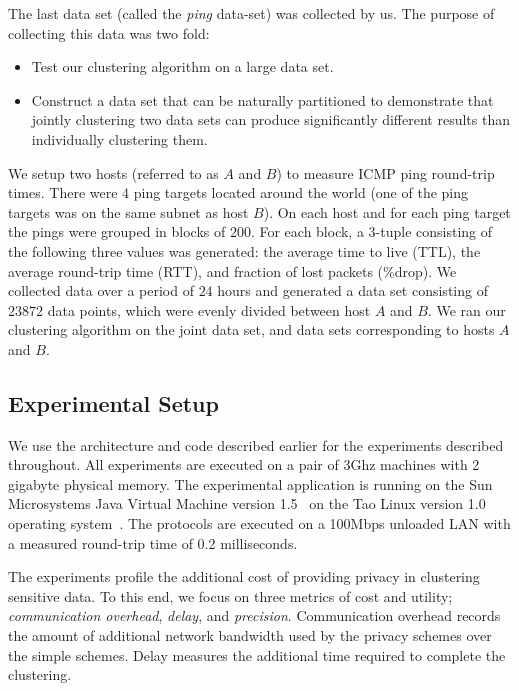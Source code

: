 The last data set (called the {\it ping} data-set) was collected by
us. The purpose of collecting this data was two fold:
\begin{itemize}
\item Test our clustering algorithm on a large data set. 
\item Construct a data set that can be naturally partitioned to demonstrate that
jointly clustering two data sets can produce significantly different
results than individually clustering them. 
\end{itemize}
We setup two hosts
(referred to as $A$ and $B$) to measure ICMP ping round-trip
times. There were $4$ ping targets located around the world (one of
the ping targets was on the same subnet as host $B$). On each host and
for each ping target the pings were grouped in blocks of $200$. For
each block, a $3$-tuple consisting of the following three values was
generated: the average time to live (TTL), the average round-trip time
(RTT), and fraction of lost packets (\%drop). We collected data over a
period of $24$ hours and generated a data set consisting of $23872$
data points, which were evenly divided between host $A$ and $B$. We
ran our clustering algorithm on the joint data set, and data sets
corresponding to hosts $A$ and $B$. 



\subsection{Experimental Setup}
\label{sec:exsetup}

We use the architecture and code described earlier for the
experiments described throughout.  All experiments are executed on a
pair of 3Ghz machines with 2 gigabyte physical memory.  The
experimental application is running on the Sun Microsystems Java
Virtual Machine version 1.5~\cite{sun04} on the Tao Linux version 1.0
operating system~\cite{tao04}.  The protocols are executed on a
100Mbps unloaded LAN with a measured round-trip time of 0.2
milliseconds.

\begin{comment}
Unless otherwise stated, the reported measurements represent the
averages taken over 100 experiments.
\end{comment}

The experiments profile the additional cost of providing privacy in
clustering sensitive data.  To this end, we focus on three metrics of
cost and utility; {\it communication overhead}, {\it delay}, and {\it
precision}.  Communication overhead records the amount of additional
network bandwidth used by the privacy schemes over the simple schemes.
Delay measures the additional time required to complete the
clustering.

